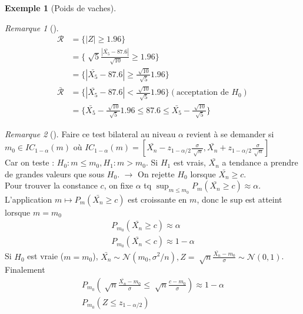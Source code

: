 \documentclass{article}
\theoremstyle{plain}%
\theoremstyle{definition}
\newtheorem{exmp}{Exemple}[section]
\theoremstyle{remark}
\newtheorem*{rem}{Remarque}
\begin{document}
\begin{exmp}[Poids de vaches]
    \begin{rem}[]
        \begin{align*}
            \mathcal{R} &= \{\left| Z \right| \geq 1.96\} \\
                        &= \{\sqrt[]{5} \frac{\left| \bar{X_5} - 87.6 \right| }{\sqrt[]{10}} \geq 1.96\} \\
                        &= \{ \left| \bar{X_5} - 87.6 \right| \geq  \frac{\sqrt[]{10}}{\sqrt[]{5}} 1.96\} \\
            \bar{\mathcal{R}} &= \{ \left| \bar{X_5} - 87.6 \right| < \frac{\sqrt[]{10}}{\sqrt[]{5}} 1.96\} (\text{acceptation de } H_0)\\
                        &= \{\bar{X_5} - \frac{\sqrt[]{10}}{\sqrt[]{5}} 1.96 \leq  87.6 \leq \bar{X_5} - \frac{\sqrt[]{10}}{\sqrt[]{5}} \}
        \end{align*}
    \end{rem}
    \begin{rem}[]
        Faire ce test bilateral au niveau $ \alpha  $ revient à se demander si $ m_0 \in IC_{1- \alpha }(m) $ où $ IC_{1 - \alpha }(m) = [\bar{X_n} - z_{1-\alpha /2} \frac{\sigma }{\sqrt[]{n}} , \bar{X_n}+ z_{1 - \alpha /2} \frac{\sigma }{\sqrt[]{n}}] $ \\
        Car on teste : $ H_0: m \leq m_0, H_1: m > m_0 $. Si $ H_1 $ est vrais, $ \bar{X_n} $ a tendance a prendre de grandes valeurs que sous $ H_0 $. $\rightarrow$ On rejette $ H_0 $ lorsque $ \bar{X_n} \geq c $. \\
        Pour trouver la constance $ c $, on fixe $ \alpha  $ tq $ \sup_{m \leq m_0} P_m (\bar{X_n} \geq c) \approx \alpha  $.\\
        L'application $ m \mapsto P_m(\bar{X_n} \geq c) $  est croissante en $ m $, donc le sup est atteint lorsque $ m=m_0 $
        \begin{align*}
            P_{m_0}(\bar{X_n} \geq c) \approx \alpha \\
            P_{m_0}(\bar{X_n} < c) \approx 1 - \alpha 
        \end{align*}
        Si $ H_0 $ est vraie ($m=m_0$), $ \bar{X_n} \sim \mathcal{N}(m_0, \sigma^2 /n), Z = \sqrt[]{n}\frac{\bar{X_n}-m_0}{\sigma} \sim \mathcal{N}(0,1) $. \\
        Finalement 
        \begin{align*}
            P_{m_0}(\sqrt[]{n}\frac{\bar{X_n}-m_0}{\sigma} \leq \sqrt[]{n}\frac{c - m_0}{\sigma }) \approx 1 - \alpha \\
            P_{m_0}(Z \leq z_{1-\alpha /2}) \\

\end{align*}
\end{rem}
\end{exmp}
\end{document}
